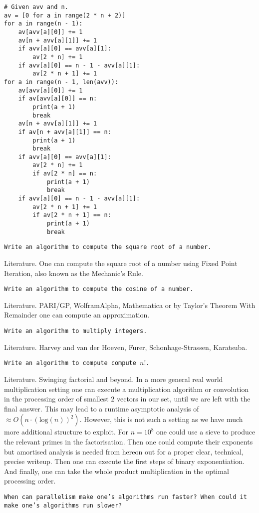 \begin{verbatim}
# Given avv and n.
av = [0 for a in range(2 * n + 2)]
for a in range(n - 1):
    av[avv[a][0]] += 1
    av[n + avv[a][1]] += 1
    if avv[a][0] == avv[a][1]:
        av[2 * n] += 1
    if avv[a][0] == n - 1 - avv[a][1]:
        av[2 * n + 1] += 1
for a in range(n - 1, len(avv)):
    av[avv[a][0]] += 1
    if av[avv[a][0]] == n:
        print(a + 1)
        break
    av[n + avv[a][1]] += 1
    if av[n + avv[a][1]] == n:
        print(a + 1)
        break
    if avv[a][0] == avv[a][1]:
        av[2 * n] += 1
        if av[2 * n] == n:
            print(a + 1)
            break
    if avv[a][0] == n - 1 - avv[a][1]:
        av[2 * n + 1] += 1
        if av[2 * n + 1] == n:
            print(a + 1)
            break
\end{verbatim}

\texttt{Write an algorithm to compute the square root of a number.}

Literature. One can compute the square root of a number using Fixed Point Iteration, also known as the Mechanic's Rule.

\texttt{Write an algorithm to compute the cosine of a number.}

Literature. PARI/GP, WolframAlpha, Mathematica or by Taylor's Theorem With Remainder one can compute an approximation.

\texttt{Write an algorithm to multiply integers.}

Literature. Harvey and van der Hoeven, Furer, Schonhage-Strassen, Karatsuba.

\texttt{Write an algorithm to compute compute $n!$.}

Literature. Swinging factorial and beyond. In a more general real world multiplication setting one can execute a multiplication algorithm or convolution in the processing order of smallest $2$ vectors in our set, until we are left with the final answer. This may lead to a runtime asymptotic analysis of $\approx O(n \cdot (\text{log}(n))^2)$. However, this is not such a setting as we have much more additional structure to exploit. For $n=10^8$ one could use a sieve to produce the relevant primes in the factorisation. Then one could compute their exponents but amortised analysis is needed from hereon out for a proper clear, technical, precise writeup. Then one can execute the first steps of binary exponentiation. And finally, one can take the whole product multiplication in the optimal processing order.

\texttt{When can parallelism make one's algorithms run faster? When could it make one's algorithms run slower?}

